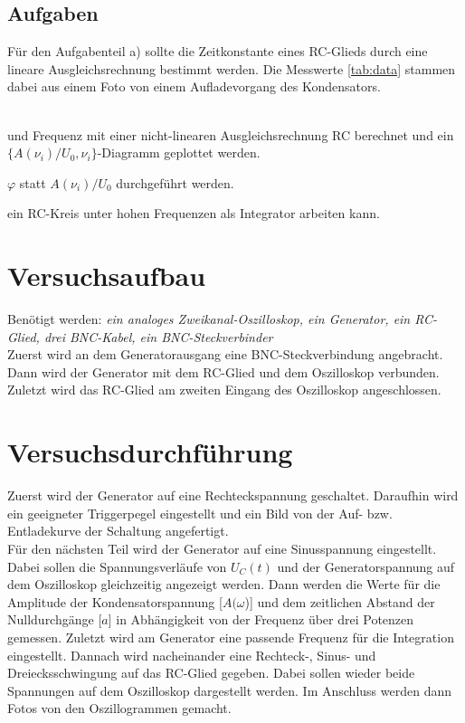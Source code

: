 \subsection{Aufgaben}
  Für den Aufgabenteil a) sollte die Zeitkonstante eines RC-Glieds durch 
  eine lineare Ausgleichsrechnung bestimmt werden. Die Messwerte \ref{tab:data} 
  stammen dabei aus einem Foto von einem Aufladevorgang des Kondensators.

  \\ und
  Frequenz mit einer nicht-linearen Ausgleichsrechnung RC berechnet und ein 
  $\{ A(\nu _i)/U_0,\nu _i \}$-Diagramm geplottet werden.

  $\varphi$ statt $A(\nu _i)/U_0$ durchgeführt werden.

  ein RC-Kreis unter hohen Frequenzen als Integrator arbeiten kann.

  



\section{Versuchsaufbau}
Benötigt werden: \textit{ein analoges Zweikanal-Oszilloskop, ein Generator, ein RC-Glied, drei BNC-Kabel, ein BNC-Steckverbinder }\\
Zuerst wird an dem Generatorausgang eine BNC-Steckverbindung angebracht. 
Dann wird der Generator mit dem RC-Glied und dem Oszilloskop verbunden. \\
Zuletzt wird das RC-Glied am zweiten Eingang des Oszilloskop angeschlossen.

\section{Versuchsdurchführung}
Zuerst wird der Generator auf eine Rechteckspannung geschaltet. Daraufhin wird
ein geeigneter Triggerpegel eingestellt und ein Bild von der Auf- bzw. Entladekurve
der Schaltung angefertigt.\\
Für den nächsten Teil wird der Generator auf eine Sinusspannung eingestellt.
Dabei sollen die Spannungsverläufe von $U_C(t)$ und der Generatorspannung auf dem
Oszilloskop gleichzeitig angezeigt werden. Dann werden die Werte für die Amplitude 
der Kondensatorspannung [$A(\omega$)] und dem zeitlichen Abstand der Nulldurchgänge 
[$a$] in Abhängigkeit von der Frequenz über drei Potenzen gemessen.
Zuletzt wird am Generator eine passende Frequenz für die Integration eingestellt.
Dannach wird nacheinander eine Rechteck-, Sinus- und Dreiecksschwingung auf das
RC-Glied gegeben. Dabei sollen wieder beide Spannungen auf dem Oszilloskop 
dargestellt werden. Im Anschluss werden dann Fotos von den Oszillogrammen gemacht.

